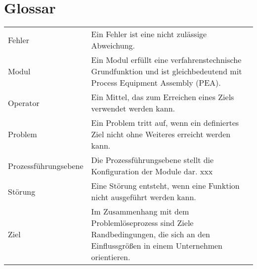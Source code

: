 
\printnomenclature  [3 cm]





\section*{Glossar}
\vspace{-0.3 cm}
\hspace{-0.3 cm}
\begin{tabular}{p{4cm}p{9cm}}
Fehler & Ein Fehler ist eine nicht zulässige Abweichung. \\
Modul & Ein Modul erfüllt eine verfahrenstechnische Grundfunktion und ist gleichbedeutend mit Process Equipment Assembly (PEA). \\
Operator & Ein Mittel, das zum Erreichen eines Ziels verwendet werden kann. \\
Problem & Ein Problem tritt auf, wenn ein definiertes Ziel nicht ohne Weiteres erreicht werden kann. \\
Prozessführungsebene & Die Prozessführungsebene stellt die Konfiguration der Module dar. xxx \\
Störung & Eine Störung entsteht, wenn eine Funktion nicht ausgeführt werden kann. \\
Ziel & Im Zusammenhang mit dem Problemlöseprozess sind Ziele Randbedingungen, die sich an den Einflussgrößen in einem Unternehmen orientieren. \\
\end{tabular}
